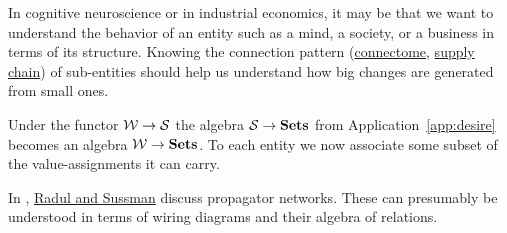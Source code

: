 \documentclass[CT4S-EN-RU]{subfiles}
\begin{document}
\begin{exampleRUS}
\end{exampleRUS}

\begin{applicationENG}
In cognitive neuroscience or in industrial economics, it may be that we want to understand the behavior of an entity such as a mind, a society, or a business in terms of its structure. Knowing the connection pattern (\href{http://en.wikipedia.org/wiki/Connectome}{connectome}, \href{http://en.wikipedia.org/wiki/Supply_chain}{supply chain}) of sub-entities should help us understand how big changes are generated from small ones.

Under the functor $\mathcal{W}\rightarrow\mathcal{S}$ the algebra $\mathcal{S}\rightarrow{\mathbf{Sets}}$ from Application~\ref{app:desire} becomes an algebra $\mathcal{W}\rightarrow{\mathbf{Sets}}$. To each entity we now associate some subset of the value-assignments it can carry. 
\end{applicationENG}

\begin{applicationRUS}
\end{applicationRUS}

\begin{applicationENG}
In \cite{RS}, \href{http://dspace.mit.edu/bitstream/handle/1721.1/44215/MIT-CSAIL-TR-2009-002.pdf?sequence=1}{Radul and Sussman} discuss propagator networks. These can presumably be understood in terms of wiring diagrams and their algebra of relations.
\end{applicationENG}
 
\begin{applicationRUS}
\end{applicationRUS}
\end{document}
